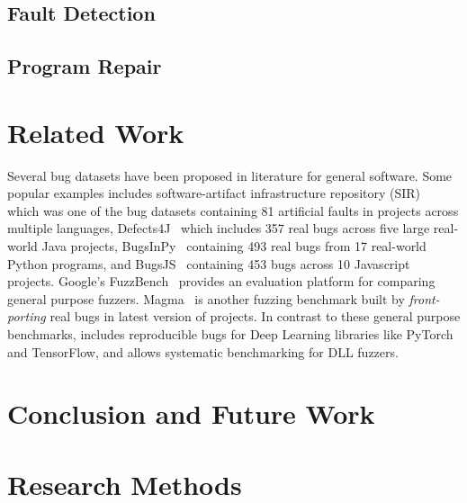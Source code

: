 \documentclass[sigconf,screen]{acmart}
\begin{document}
\subsection{Fault Detection}
\subsection{Program Repair}


\section{Related Work} 
Several bug datasets have been proposed in literature for general software. Some
popular examples includes software-artifact infrastructure repository
(SIR)~\cite{do2005supporting} which was one of the bug datasets containing 81
artificial faults in projects across multiple languages,
Defects4J~\cite{just2014defects4j} which includes 357 real bugs across five
large real-world Java projects, BugsInPy~\cite{widyasari2020bugsinpy} containing
493 real bugs from 17 real-world Python programs, and
BugsJS~\cite{vancsics2020relationship} containing 453 bugs across 10 Javascript
projects.
%
Google's FuzzBench~\cite{metzman2021fuzzbench} provides an evaluation platform
for comparing general purpose fuzzers. Magma~\cite{hazimeh2020magma} is another
fuzzing benchmark built by \emph{front-porting} real bugs in latest version of
projects. In contrast to these general purpose benchmarks, \tname includes
reproducible bugs for Deep Learning libraries like PyTorch and TensorFlow, and
allows systematic benchmarking for DLL fuzzers. 






\section{Conclusion and Future Work}




\appendix

\section{Research Methods}
\end{document}

